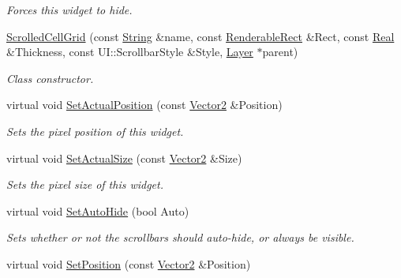 \begin{DoxyCompactItemize}
\begin{DoxyCompactList}\small\item\em Forces this widget to hide. \item\end{DoxyCompactList}\item 
\hyperlink{classphys_1_1UI_1_1ScrolledCellGrid_a55568ced472f194c6fd6a07310b68561}{ScrolledCellGrid} (const \hyperlink{namespacephys_aa03900411993de7fbfec4789bc1d392e}{String} \&name, const \hyperlink{structphys_1_1UI_1_1RenderableRect}{RenderableRect} \&Rect, const \hyperlink{namespacephys_af7eb897198d265b8e868f45240230d5f}{Real} \&Thickness, const UI::ScrollbarStyle \&Style, \hyperlink{classphys_1_1UI_1_1Layer}{Layer} $\ast$parent)
\begin{DoxyCompactList}\small\item\em Class constructor. \item\end{DoxyCompactList}\item 
virtual void \hyperlink{classphys_1_1UI_1_1ScrolledCellGrid_aceff3ee36c2677d55e1a4e355611eef9}{SetActualPosition} (const \hyperlink{classphys_1_1Vector2}{Vector2} \&Position)
\begin{DoxyCompactList}\small\item\em Sets the pixel position of this widget. \item\end{DoxyCompactList}\item 
virtual void \hyperlink{classphys_1_1UI_1_1ScrolledCellGrid_a32ee6cc683f7357afef8b7075d8b8f20}{SetActualSize} (const \hyperlink{classphys_1_1Vector2}{Vector2} \&Size)
\begin{DoxyCompactList}\small\item\em Sets the pixel size of this widget. \item\end{DoxyCompactList}\item 
virtual void \hyperlink{classphys_1_1UI_1_1ScrolledCellGrid_ab3b8ac3f85185c1a9236cf80569659d8}{SetAutoHide} (bool Auto)
\begin{DoxyCompactList}\small\item\em Sets whether or not the scrollbars should auto-\/hide, or always be visible. \item\end{DoxyCompactList}\item 
virtual void \hyperlink{classphys_1_1UI_1_1ScrolledCellGrid_aef62a124cb71b39bc73bda770741882f}{SetPosition} (const \hyperlink{classphys_1_1Vector2}{Vector2} \&Position)

\end{DoxyCompactItemize}
